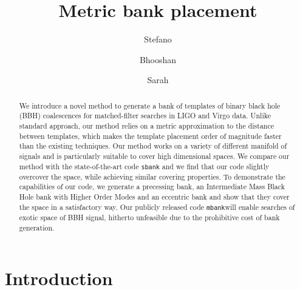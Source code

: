 \documentclass[twocolumn,showpacs,preprintnumbers,nofootinbib,prd,
superscriptaddress,10pt]{revtex4-2}
\newcommand{\mbank}{\texttt{mbank}}
\begin{document}
\begin{abstract}
	We introduce a novel method to generate a bank of templates of binary black hole (BBH) coalescences for matched-filter searches in LIGO and Virgo data. Unlike standard approach, our method relies on a metric approximation to the distance between templates, which makes the template placement order of magnitude faster than the existing techniques.
	Our method works on a variety of different manifold of signals and is particularly suitable to cover high dimensional spaces.
	We compare our method with the state-of-the-art code \texttt{sbank} and we find that our code slightly overcover the space, while achieving similar covering properties. To demonstrate the capabilities of our code, we generate a precessing bank, an Intermediate Mass Black Hole bank with Higher Order Modes and an eccentric bank and show that they cover the space in a satisfactory way.
	Our publicly released code \mbank will enable searches of exotic space of BBH signal, hitherto unfeasible due to the prohibitive cost of bank generation.
\end{abstract}
	
	\title{Metric bank placement}
	\author{Stefano }

	\author{Bhooshan }
        
	\author{Sarah }
	\maketitle

	\tableofcontents

\section{Introduction}
\end{document}
